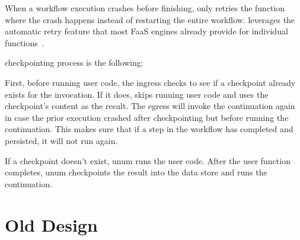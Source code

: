 When a workflow execution crashes before finishing, \name{} only retries the
function where the crash happens instead of restarting the entire workflow.
\name{} leverages the automatic retry feature that most FaaS engines already provide
for individual functions~\cite{azure-functions-retry,
google-cloud-functions-retry, aws-lambda-async-invoke}.

\name{} checkpointing process is the following:

First, before running user code, the ingress checks to see if a checkpoint
already exists for the invocation. If it does, \name{} skips running user code
and uses the checkpoint's content as the result. The egress will invoke the
continuation again in case the prior execution crashed after checkpointing but
before running the continuation. This makes sure that if a step in the
workflow has completed and persisted, it will not run again.

If a checkpoint doesn't exist, unum runs the user code. After the user
function completes, unum checkpoints the result into the data store and runs
the continuation.


\section{Old Design}\label{sec:design}

%
%

